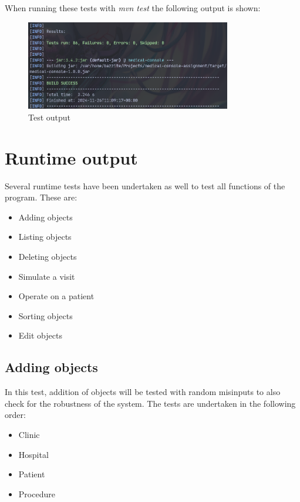 \documentclass{article}
\begin{document}
	When running these tests with \textit{mvn test} the following output is shown:
	\begin{figure}
		\begin{center}
			\includegraphics[width=0.8\textwidth]{figures/Mvn_test.png}
		\end{center}
		\caption{Test output}\label{fig:}
	\end{figure}
	

	\section{Runtime output}\label{sec:runtime_output} %
	Several runtime tests have been undertaken as well to test all functions of the program. These are:
	\begin{itemize}
		\item Adding objects
		\item Listing objects
		\item Deleting objects
		\item Simulate a visit
		\item Operate on a patient
		\item Sorting objects 
		\item Edit objects
	\end{itemize}

	\subsection{Adding objects}\label{sub:adding_objects} %
	In this test, addition of objects will be tested with random misinputs to also check for the robustness of the system. The tests are undertaken in the following order: 
	\begin{itemize}
		\item Clinic 
		\item Hospital 
		\item Patient
		\item Procedure
	\end{itemize}
\end{document}
